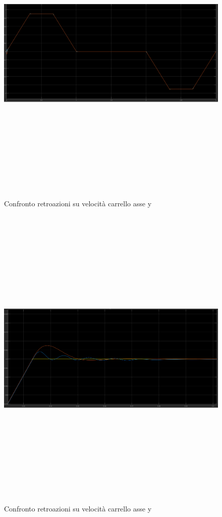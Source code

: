 \documentclass{article}
\begin{document}
\begin{figure}[H]
\centering
\includegraphics[width=13cm,height=15cm,keepaspectratio]{./simulink/ldm_variabile/PIDY_VELOCITA}
\caption{Confronto retroazioni su velocità carrello asse y}
\end{figure}


\begin{figure}[H]
\centering
\includegraphics[width=13cm,height=15cm,keepaspectratio]{./simulink/ldm_variabile/PIDYZOOM}
\caption{Confronto retroazioni su velocità carrello asse y}
\end{figure}
\end{document}
